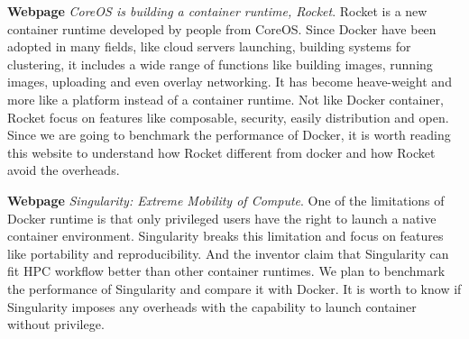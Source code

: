 \documentclass{article}
\begin{document}
\medskip

\textbf{Webpage} \emph{CoreOS is building a container runtime, Rocket}\cite{rocketwb}. Rocket is
a new container runtime developed by people from CoreOS. Since Docker have been adopted in many 
fields, like cloud servers launching, building systems for clustering, it includes a wide range
of functions like building images, running images, uploading and even overlay networking. It has 
become heave-weight and more like a platform instead of a container runtime. Not like Docker 
container, Rocket focus on features like composable, security, easily distribution and open. Since 
we are going to benchmark the performance of Docker, it is worth reading this website to understand
how Rocket different from docker and how Rocket avoid the overheads.

\medskip

\textbf{Webpage} \emph{Singularity: Extreme Mobility of Compute}\cite{singularity}. One of the 
limitations of Docker runtime is that only privileged users have the right to launch a native
container environment. Singularity breaks this limitation and focus on features like portability 
and reproducibility. And the inventor claim that Singularity can fit HPC workflow better 
than other container runtimes. We plan to benchmark the performance of Singularity and compare 
it with Docker. It is worth to know if Singularity imposes any overheads with the capability to 
launch container without privilege.  







\end{document}
